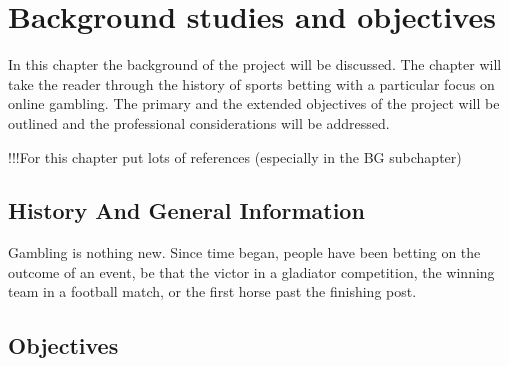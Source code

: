 \chapter{Background studies and objectives}
\label{ch:Background}

In this chapter the background of the project will be discussed. The chapter will take the reader through the history of sports betting with a particular focus on online gambling. The primary and the extended objectives of the project will be outlined and the professional considerations will be addressed. 

!!!For this chapter put lots of references (especially in the BG subchapter)

\section{History And General Information}
\label{sec:history}
Gambling is nothing new. Since time began, people have been betting on the outcome of an event, be that the victor in a gladiator competition, the winning team in a football match, or the first horse past the finishing post.


\section{Objectives}
\label{sec:objectives}

